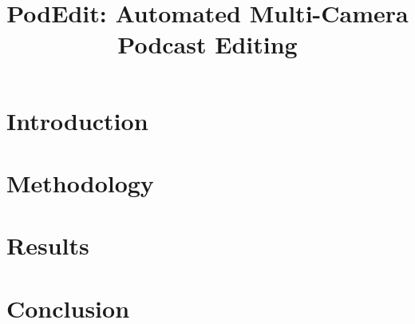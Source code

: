 \documentclass{article}
\begin{document}
\title{PodEdit: Automated Multi-Camera Podcast Editing}
\author{}
\date{}

\maketitle

\begin{abstract}
\end{abstract}

\section{Introduction}

\section{Methodology}

\section{Results}

\section{Conclusion}
\end{document}
